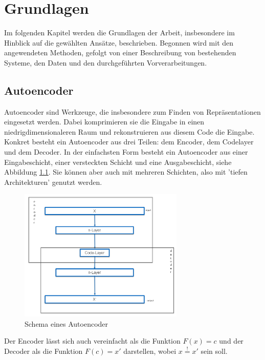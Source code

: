 \chapter{Grundlagen}
\label{chap:Grundlagen}
Im folgenden Kapitel werden die Grundlagen der Arbeit, insbesondere im Hinblick auf die gewählten Ansätze, beschrieben. Begonnen wird mit den angewendeten Methoden, gefolgt von einer Beschreibung von bestehenden Systeme, den Daten und den durchgeführten Vorverarbeitungen.

	\section{Autoencoder}
	\label{sec:ConvolutionalAutoencoder}		
	Autoencoder \cite{D.E.Rumelhart.1987} sind Werkzeuge, die insbesondere zum Finden von Repräsentationen eingesetzt werden. Dabei komprimieren sie die Eingabe in einen niedrigdimensionaleren Raum und rekonstruieren aus diesem Code die Eingabe. Konkret besteht ein Autoencoder aus drei Teilen: dem Encoder, dem Codelayer und dem Decoder. In der einfachsten Form besteht ein Autoencoder aus einer Eingabeschicht, einer versteckten Schicht und eine Ausgabeschicht, siehe Abbildung \ref{img:SchemaCAE}. Sie können aber auch mit mehreren Schichten, also mit 'tiefen Architekturen' genutzt werden. \cite{Hinton.2006}
	\begin{figure}[h]
		\centering
		\includegraphics[width=0.7\textwidth, center]{bilder/Schema_Autoencoders/Schema_CAE2.png}
		\caption[Schema Autoencoder]{Schema eines Autoencoder}
		\label{img:SchemaCAE}
	\end{figure} 

	Der Encoder lässt sich auch vereinfacht als die Funktion $F(x)=c$ und der Decoder als die Funktion $ F(c)=x'$ darstellen, wobei $x\stackrel{!}{=}x'$ sein soll.
	 
